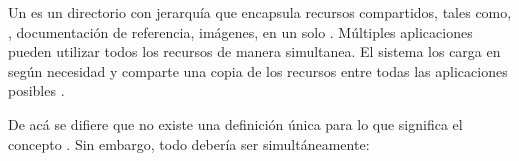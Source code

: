 %
%
%


Un \frameworkPC es un directorio con jerarquía que encapsula recursos compartidos, tales como, \dynamSharedLibAS, documentación de referencia, imágenes, en un solo \packageAS. Múltiples aplicaciones pueden utilizar todos los recursos de manera simultanea. El sistema los carga en \memoryPC según necesidad y comparte una copia de los recursos entre todas las aplicaciones posibles \cite{online_apple_what_is_framework}.

De acá se difiere que no existe una definición única para lo que significa el concepto \frameworkPC. Sin embargo, todo \frameworkPC debería ser simultáneamente: 

